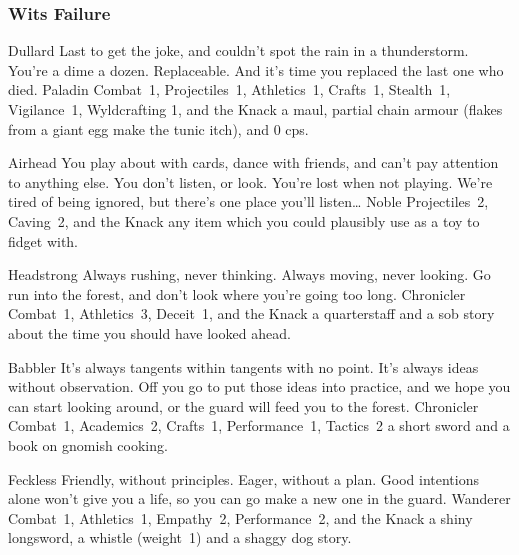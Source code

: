 \begin{multicols}{2}
\begin{itemize}
\end{itemize}

\needspace{10em}
\subsubsection{Wits Failure}
\begin{itemize}

  {Dullard}%
  {%
    Last to get the joke, and couldn't spot the rain in a thunderstorm.
    You're a dime a dozen.
    Replaceable.
    And it's time you replaced the last one who died.
  }%
  {Paladin}%
  {Combat~1, Projectiles~1, Athletics~1, Crafts~1, Stealth~1, Vigilance~1, Wyldcrafting 1, and the Knack \lucky}%
  {a maul, partial chain armour (flakes from a giant egg make the tunic itch), and 0 \glspl{cp}.}%

  {Airhead}%
  {You play about with cards, dance with friends, and can't pay attention to anything else.
  You don't listen, or look.
  You're lost when not playing.
  We're tired of being ignored, but there's one place you'll listen\ldots
  }%
  {Noble}%
  {Projectiles~2, Caving~2, and the Knack \unstoppable}%
  {any item which you could plausibly use as a toy to fidget with.}%

  {Headstrong}%
  {Always rushing, never thinking.
  Always moving, never looking.
  Go run into the forest, and don't look where you're going too long.
  }%
  {Chronicler}%
  {Combat~1, Athletics~3, Deceit~1, and the Knack \charge}%
  {a quarterstaff and a sob story about the time you should have looked ahead.}%

  {Babbler}%
  {It's always tangents within tangents with no point.
  It's always ideas without observation.
  Off you go to put those ideas into practice, and we hope you can start looking around, or the \gls{guard} will feed you to the forest.
  }%
  {Chronicler}%
  {Combat~1, Academics~2, Crafts~1, Performance~1, Tactics~2}%
  {a short sword and a book on gnomish cooking.}%

  {Feckless}%
  {Friendly, without principles.
  Eager, without a plan.
  Good intentions alone won't give you a life, so you can go make a new one in the \gls{guard}.
  }%
  {Wanderer}%
  {Combat~1, Athletics~1, Empathy~2, Performance~2, and the Knack \fasthealer}%
  {a shiny longsword, a whistle (\gls{weight}~1) and a shaggy dog story.}%


\end{itemize}
\end{multicols}
